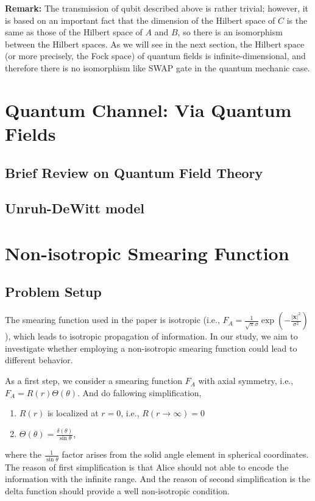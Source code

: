 \documentclass[a4paper,12pt]{article}
\begin{document}
\textbf{Remark: }
The transmission of qubit described above is rather trivial; however, it is based on an important fact that the dimension of the Hilbert space of $ C $ is the same as those of the Hilbert space of $ A $ and $ B $, so there is an isomorphism between the Hilbert spaces.
As we will see in the next section, the Hilbert space (or more precisely, the Fock space) of quantum fields is infinite-dimensional, and therefore there is no isomorphism like SWAP gate in the quantum mechanic case.

\section{Quantum Channel: Via Quantum Fields}
\subsection{Brief Review on Quantum Field Theory}
\subsection{Unruh-DeWitt model}

\section{Non-isotropic Smearing Function}
\subsection{Problem Setup}
The smearing function used in the paper is isotropic (i.e., $F_A = \frac{1}{\sqrt{\pi}\sigma} \exp\left(-\frac{|\mathbf{x}|^2}{\sigma^2}\right)$), which leads to isotropic propagation of information. In our study, we aim to investigate whether employing a non-isotropic smearing function could lead to different behavior.

As a first step, we consider a smearing function $F_A$ with axial symmetry, i.e., $F_A = R(r)\Theta(\theta)$.
And do fallowing simplification, 
\begin{enumerate}
  \item $R(r)$ is localized at $r = 0$, i.e., $R(r \rightarrow \infty) = 0$
  \item $\Theta(\theta) = \frac{\delta(\theta)}{\sin{\theta}}$,
\end{enumerate}
where the $\frac{1}{\sin\theta}$ factor arises from the solid angle element in spherical coordinates.
The reason of first simplification is that Alice should not able to encode the information with the infinite range. And the reason of second simplification is the delta function should provide a well non-isotropic condition.
\end{document}
